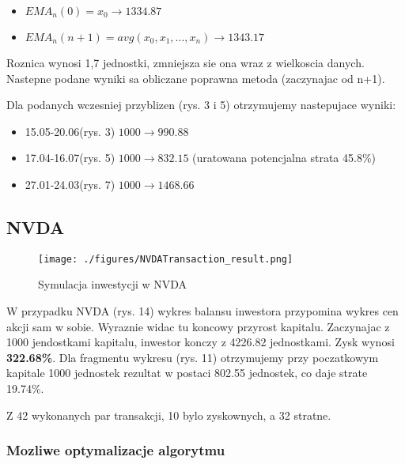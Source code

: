 \documentclass[a4paper,12pt]{article}  %
\begin{document}

\begin{itemize}
  \item $EMA_{n}(0) = x_0 \rightarrow 1334.87$  
  \item $EMA_{n}(n+1) = avg(x_0, x_1, ..., x_n) \rightarrow 1343.17 $ 
\end{itemize}

Roznica wynosi 1,7 jednostki, zmniejsza sie ona wraz z wielkoscia danych.
Nastepne podane wyniki sa obliczane poprawna metoda (zaczynajac od n+1).

\smallbreak
Dla podanych wczesniej przyblizen (rys. 3 i 5) otrzymujemy nastepujace wyniki:

\begin{itemize}
  \item 15.05-20.06(rys. 3)  $1000 \rightarrow 990.88$
  \item 17.04-16.07(rys. 5) $1000 \rightarrow 832.15$ (uratowana
    potencjalna strata 45.8\%)
  \item 27.01-24.03(rys. 7)  $1000 \rightarrow 1468.66$
\end{itemize}



\subsection{NVDA}

\begin{figure}[H]
  \centering
  \texttt{[image: ./figures/NVDATransaction\_result.png]}
  \caption{Symulacja inwestycji w NVDA}
\end{figure}

W przypadku NVDA (rys. 14) wykres balansu inwestora przypomina 
wykres cen akcji sam w sobie. Wyraznie widac tu koncowy przyrost kapitalu.
Zaczynajac z 1000 jendostkami kapitalu, inwestor konczy z 4226.82 jednostkami.
Zysk wynosi \textbf{322.68\%}. Dla fragmentu wykresu (rys. 11) otrzymujemy przy poczatkowym kapitale 1000
jednostek rezultat w postaci 802.55 jednostek, co daje strate 19.74\%.

Z 42 wykonanych par transakcji, 10 bylo zyskownych, a 32 stratne.

\subsubsection{Mozliwe optymalizacje algorytmu}
\end{document}
